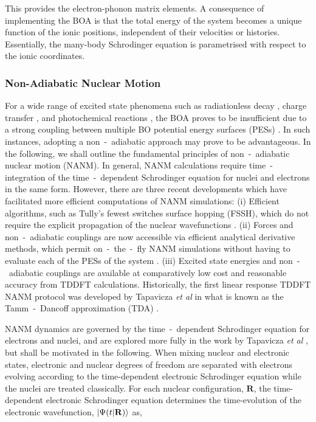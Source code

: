 This provides the electron-phonon matrix elements. A consequence of implementing the BOA is that the total energy of the system becomes a unique function of the ionic positions, independent of their velocities or  histories. Essentially, the many-body Schrodinger equation is parametrised with respect to the ionic coordinates.

\subsubsection{Non-Adiabatic Nuclear Motion}
\label{sec:NA_MD}

For a wide range of excited state phenomena such as radiationless decay \cite{doi:10.1021/cr60310a002}, charge transfer \cite{doi:https://doi.org/10.1002/9783527633791.ch7}, and photochemical reactions \cite{turro1978modern}, the BOA proves to be insufficient due to a strong coupling between multiple BO potential energy surfaces (PESs) \cite{doi:10.1142/9789812565464_0001}. In such instances, adopting a non~-~adiabatic approach may prove to be advantageous. In the following, we shall outline the fundamental principles of non~-~adiabatic nuclear motion (NANM). In general, NANM calculations require time~-~ integration of the time~-~dependent Schrodinger equation for nuclei and electrons in the same form. However, there are three recent developments which have facilitated more efficient computations of NANM simulations: (i) Efficient algorithms, such as Tully's fewest switches surface hopping (FSSH), which do not require the explicit propagation of the nuclear wavefunctions \cite{10.1063/1.459170}. (ii) Forces and non~-~adiabatic couplings are now accessible via efficient analytical derivative methods, which permit on~-~the~-~fly NANM simulations without having to evaluate each of the PESs of the system \cite{doi:10.1080/00268970210155121,10.1063/1.480511,10.1063/1.1888573,10.1063/1.4908034}. (iii) Excited state energies \cite{10.1063/1.1508368} and non~-~adiabatic couplings \cite{10.1063/1.3292571} are available at comparatively low cost and reasonable accuracy from TDDFT calculations. Historically, the first linear response TDDFT NANM protocol was developed by Tapavicza \textit{et al} \cite{10.1063/1.3265858} in what is known as the Tamm~-~Dancoff approximation (TDA) \cite{PhysRevLett.98.023001}.

NANM dynamics are governed by the time~-~dependent Schrodinger equation for electrons and nuclei, and are explored more fully in the work by Tapavicza \textit{et al} \cite{C3CP51514A}, but shall be motivated in the following. When mixing nuclear and electronic states, electronic and nuclear degrees of freedom are separated with electrons evolving according to the time-dependent electronic Schrodinger equation while the nuclei are treated classically. For each nuclear configuration, $\textbf{R}$, the time-dependent electronic Schrodinger equation determines the time-evolution of the electronic wavefunction, $\ket{\Psi(t|\textbf{R})}$ as,  

